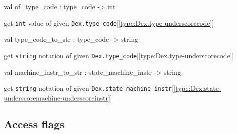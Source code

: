 \documentclass[11pt]{article}
\begin{document}
\label{val:Dex.of-underscoretype-underscorecode}\begin{ocamldoccode}
val of_type_code : type_code -> int
\end{ocamldoccode}
\begin{ocamldocdescription}
get {\tt{int}} value of given {\tt{Dex.type\_code}}[\ref{type:Dex.type-underscorecode}]


\end{ocamldocdescription}




\label{val:Dex.type-underscorecode-underscoreto-underscorestr}\begin{ocamldoccode}
val type_code_to_str : type_code -> string
\end{ocamldoccode}
\begin{ocamldocdescription}
get {\tt{string}} notation of given {\tt{Dex.type\_code}}[\ref{type:Dex.type-underscorecode}]


\end{ocamldocdescription}




\label{val:Dex.machine-underscoreinstr-underscoreto-underscorestr}\begin{ocamldoccode}
val machine_instr_to_str : state_machine_instr -> string
\end{ocamldoccode}
\begin{ocamldocdescription}
get {\tt{string}} notation of given {\tt{Dex.state\_machine\_instr}}[\ref{type:Dex.state-underscoremachine-underscoreinstr}]


\end{ocamldocdescription}




\subsection{Access flags}
\end{document}
